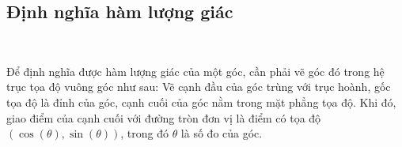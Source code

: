 \subsection{Định nghĩa hàm lượng giác}

\ %

Để định nghĩa được hàm lượng giác của một góc, cần phải vẽ góc đó trong hệ trục tọa độ vuông góc như sau: Vẽ cạnh đầu của góc trùng với trục hoành, gốc tọa độ là đỉnh của góc, cạnh cuối của góc nằm trong mặt phẳng tọa độ. Khi đó, giao điểm của cạnh cuối với đường tròn đơn vị là điểm có tọa độ $(\cos \left(\theta\right), \sin \left(\theta\right))$, trong đó $\theta$ là số đo của góc.